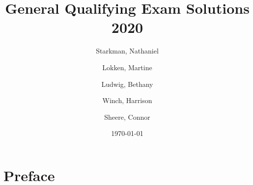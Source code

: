 \documentclass[a4paper,11pt, english]{report}
\begin{document}

\title{\Huge{\textbf{General Qualifying Exam Solutions 2020}}}
\author{{Starkman}, Nathaniel \\
   \and {Lokken}, Martine \\
   \and {Ludwig}, Bethany \\
   \and {Winch}, Harrison \\
   \and {Sheere}, Connor
}
\date{\today}

\begin{titlepage}

	

    \maketitle

\end{titlepage}


\chapter*{Preface}



\tableofcontents
\let\tableofcontents\relax

\end{document}
